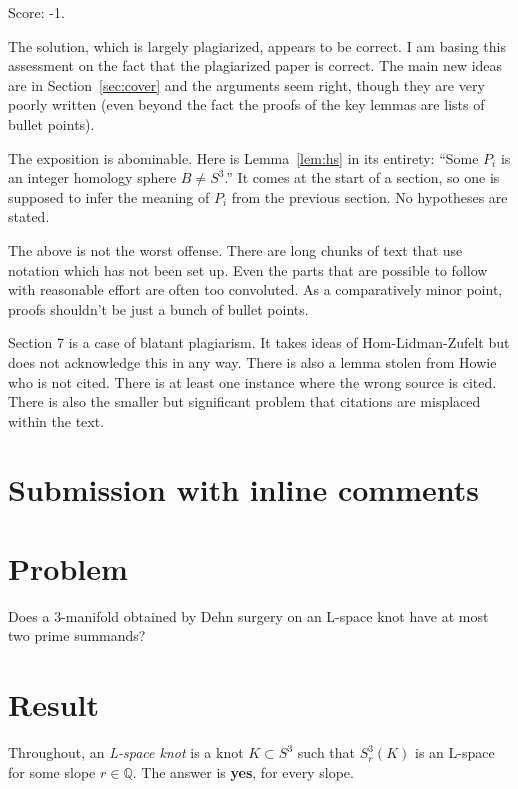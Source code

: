 \documentclass[11pt]{article}
\theoremstyle{definition}
\newcommand{\Q}{\mathbb{Q}}
\begin{document}
\noindent Score: -1. 


The solution, which is largely plagiarized, appears to be correct. I am basing this assessment on the fact that the plagiarized paper is correct. The main new ideas are in Section~\ref{sec:cover} and the arguments seem right, though they are very poorly written (even beyond the fact the proofs of the key lemmas are lists of bullet points).

The exposition is abominable. Here is Lemma~\ref{lem:hs} in its entirety: ``Some $P_i$ is an integer homology sphere $B\ne S^3$.'' It comes at the start of a section, so one is supposed to infer the meaning of $P_i$ from the previous section. No hypotheses are stated.

The above is not the worst offense. There are long chunks of text that use notation which has not been set up.  Even the parts that are possible to follow with reasonable effort are often too convoluted. As a comparatively minor point, proofs shouldn't be just a bunch of bullet points.

Section 7 is a case of blatant plagiarism. It takes ideas of Hom-Lidman-Zufelt but does not acknowledge this in any way. There is also a lemma stolen from Howie who is not cited. There is at least one instance where the wrong source is cited. There is also the smaller but significant problem that citations are misplaced within the text. 

\newpage
\section{Submission with inline comments}


\section*{Problem}

Does a $3$-manifold obtained by Dehn surgery on an L-space knot have at most two prime summands?

\section*{Result}

Throughout, an \emph{L-space knot} is a knot $K\subset S^3$ such that $S^3_r(K)$ is an L-space for some slope $r\in\Q$. The answer is \textbf{yes}, for every slope. 
\end{document}
